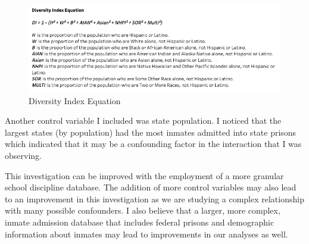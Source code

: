 \documentclass[12pt]{article}
\begin{document}
\begin{figure}[H]
  \centering
  \includegraphics[width = 17cm]{DiversityIndex.png}
  \caption{Diversity Index Equation}
  \label{fig:DI}
\end{figure}

Another control variable I included was state population. I noticed that the largest states (by population) had the most inmates admitted into state prisons which indicated that it may be a confounding factor in the interaction that I was observing.

This investigation can be improved with the employment of a more granular school discipline database. The addition of more control variables may also lead to an improvement in this investigation as we are studying a complex relationship with many possible confounders. I also believe that a larger, more complex, inmate admission database that includes federal prisons and demographic information about inmates may lead to improvements in our analyses as well. 

\clearpage









\end{document}
